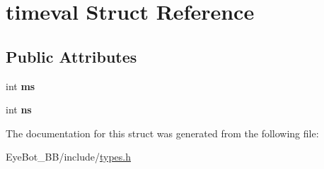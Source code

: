\hypertarget{structtimeval}{\section{timeval \-Struct \-Reference}
\label{structtimeval}
}
\subsection*{\-Public \-Attributes}
\begin{DoxyCompactItemize}
\item 
\hypertarget{structtimeval_a2804eb7d3edd302e7c9b5d9bb979d03b}{int {\bfseries ms}}\label{structtimeval_a2804eb7d3edd302e7c9b5d9bb979d03b}

\item 
\hypertarget{structtimeval_aa02cce80184b73b9635939046137519b}{int {\bfseries ns}}\label{structtimeval_aa02cce80184b73b9635939046137519b}

\end{DoxyCompactItemize}


\-The documentation for this struct was generated from the following file\-:\begin{DoxyCompactItemize}
\item 
\-Eye\-Bot\-\_\-\-B\-B/include/\hyperlink{types_8h}{types.\-h}\end{DoxyCompactItemize}
